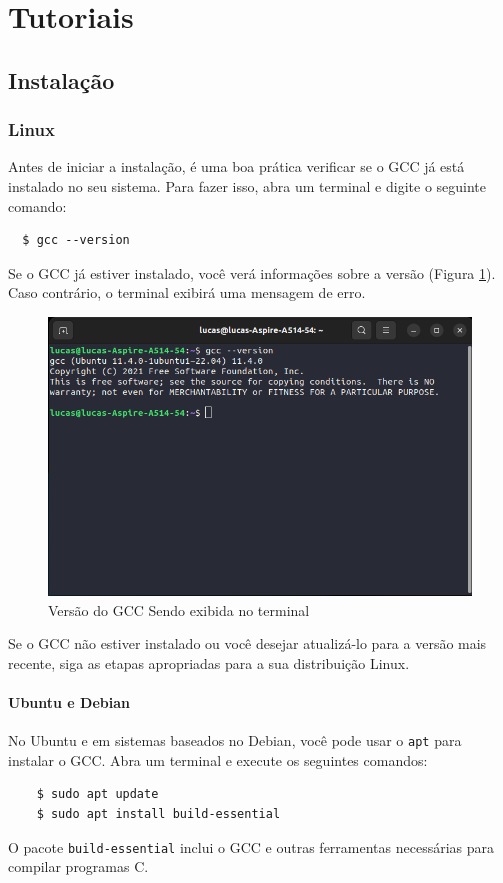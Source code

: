 \section{Tutoriais}

\subsection{Instalação}
\subsubsection{Linux}
Antes de iniciar a instalação, é uma boa prática verificar se o GCC já está instalado no seu sistema. Para fazer isso, abra um terminal e digite o seguinte comando:
\begin{verbatim}
  $ gcc --version
\end{verbatim}
Se o GCC já estiver instalado, você verá informações sobre a versão (Figura \ref{fig:versao_gcc}). Caso contrário, o terminal exibirá uma mensagem de erro.

\begin{figure}[H]
    \begin{center}
  \includegraphics[width=450px]{imagens/versao_gcc.png}
  \end{center}
  \caption{Versão do GCC Sendo exibida no terminal}
  \label{fig:versao_gcc}
\end{figure}

Se o GCC não estiver instalado ou você desejar atualizá-lo para a versão mais recente, siga as etapas apropriadas para a sua distribuição Linux.

\paragraph{Ubuntu e Debian}
No Ubuntu e em sistemas baseados no Debian, você pode usar o \texttt{apt} para instalar o GCC. Abra um terminal e execute os seguintes comandos:
\begin{verbatim}
    $ sudo apt update
    $ sudo apt install build-essential
\end{verbatim}
O pacote \texttt{build-essential} inclui o GCC e outras ferramentas necessárias para compilar programas C.

